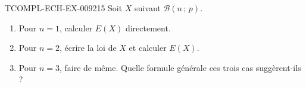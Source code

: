 \begin{exercice}{TCOMPL-ECH-EX-009}{2}{15}
Soit $X$ suivant $\mathcal{B}(n\,;\,p)$.
\begin{enumerate}
  \item Pour $n=1$, calculer $E(X)$ directement.
  \item Pour $n=2$, écrire la loi de $X$ et calculer $E(X)$.
  \item Pour $n=3$, faire de même. Quelle formule générale ces trois cas
        suggèrent-ils ?
\end{enumerate}
\end{exercice}
